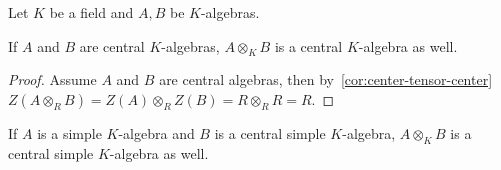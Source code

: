 Let $K$ be a field and $A, B$ be $K$-algebras.
\begin{lemma}
  \label{lem:tensor-central}
  If $A$ and $B$ are central $K$-algebras, $A\otimes_{K}B$ is a central
  $K$-algebra as well.
  \leanok
\end{lemma}
\begin{proof}
  Assume $A$ and $B$ are central algebras, then
  by~\cref{cor:center-tensor-center}
  $Z\left(A\otimes_{R}B\right)=Z\left(A\right)\otimes_{R}Z\left(B\right)=R\otimes_{R}R=R$.
\end{proof}

\begin{theorem}
  \label{thm:tensor-csa}
  If $A$ is a simple $K$-algebra and $B$ is a central simple $K$-algebra,
  $A\otimes_{K}B$ is a central simple $K$-algebra as well. 
  \leanok
\end{theorem}
